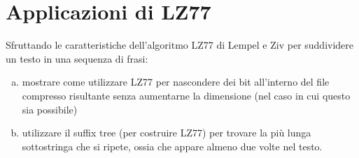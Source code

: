 \chapter{Applicazioni di LZ77}

\begin{problem*}
  Sfruttando le caratteristiche dell'algoritmo LZ77 di Lempel e Ziv per
  suddividere un testo in una sequenza di frasi:
  \begin{enumerate}[(a)]
    \item mostrare come utilizzare LZ77 per nascondere dei bit all'interno 
    del file compresso risultante senza aumentarne la dimensione (nel caso
    in cui questo sia possibile)
    \item utilizzare il suffix tree (per costruire LZ77) per trovare la pi\`u 
    lunga sottostringa che si ripete, ossia che appare almeno due volte nel 
    testo.
  \end{enumerate}
\end{problem*}

